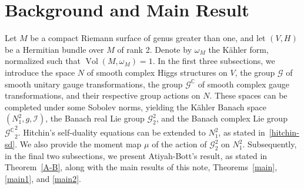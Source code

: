 \documentclass[a4paper]{amsart}
\theoremstyle{definition}
\theoremstyle{remark}
\numberwithin{equation}{section}
\begin{document}
\vspace{1cm}

\begin{center}
\end{center}

\vspace{1cm}

\section{Background and Main Result}

Let $M$ be a compact Riemann surface of genus greater than one, and let $(V, H)$ be a Hermitian bundle over $M$ of rank 2. Denote by $\omega_M$ the Kähler form, normalized such that $\operatorname{Vol}(M, \omega_M) = 1$. In the first three subsections, we introduce the space $N$ of smooth complex Higgs structures on $V$, the group $\mathscr{G}$ of smooth unitary gauge transformations, the group $\mathscr{G}^\mathbb{C}$ of smooth complex gauge transformations, and their respective group actions on $N$. These spaces can be completed under some Sobolev norms, 
yielding the Kähler Banach space $(N_1^2, g, \mathcal{I})$, the Banach real Lie group $\mathscr{G}_2^2$, and the Banach complex Lie group ${\mathscr{G}^\mathbb{C}}_2^2$. Hitchin's self-duality equations can be extended to $N_1^2$, as stated in~\eqref{hitchin-sd}. We also provide the moment map $\mu$ of the action of $\mathscr{G}_2^2$ on $N_1^2$. Subsequently, in the final two subsections, we present Atiyah-Bott's result, as stated in Theorem~\ref{A-B}, along with the main results of this note, Theorems~\ref{main}, \ref{main1}, and \ref{main2}.
\end{document}
